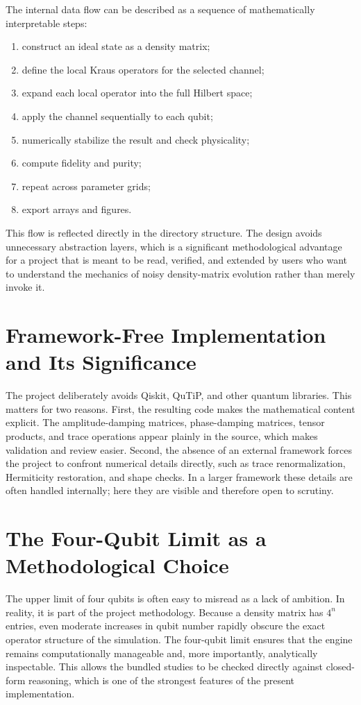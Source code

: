The internal data flow can be described as a sequence of mathematically interpretable steps:
\begin{enumerate}
\item construct an ideal state as a density matrix;
\item define the local Kraus operators for the selected channel;
\item expand each local operator into the full Hilbert space;
\item apply the channel sequentially to each qubit;
\item numerically stabilize the result and check physicality;
\item compute fidelity and purity;
\item repeat across parameter grids;
\item export arrays and figures.
\end{enumerate}

This flow is reflected directly in the directory structure. The design avoids unnecessary abstraction layers, which is a significant methodological advantage for a project that is meant to be read, verified, and extended by users who want to understand the mechanics of noisy density-matrix evolution rather than merely invoke it.

\section{Framework-Free Implementation and Its Significance}

The project deliberately avoids Qiskit, QuTiP, and other quantum libraries. This matters for two reasons. First, the resulting code makes the mathematical content explicit. The amplitude-damping matrices, phase-damping matrices, tensor products, and trace operations appear plainly in the source, which makes validation and review easier. Second, the absence of an external framework forces the project to confront numerical details directly, such as trace renormalization, Hermiticity restoration, and shape checks. In a larger framework these details are often handled internally; here they are visible and therefore open to scrutiny.

\section{The Four-Qubit Limit as a Methodological Choice}

The upper limit of four qubits is often easy to misread as a lack of ambition. In reality, it is part of the project methodology. Because a density matrix has $4^n$ entries, even moderate increases in qubit number rapidly obscure the exact operator structure of the simulation. The four-qubit limit ensures that the engine remains computationally manageable and, more importantly, analytically inspectable. This allows the bundled studies to be checked directly against closed-form reasoning, which is one of the strongest features of the present implementation.

